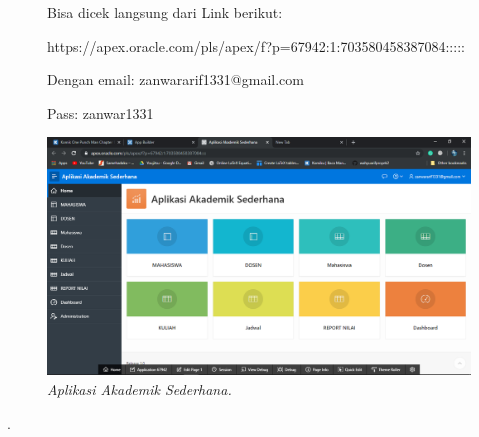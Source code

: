 \begin{enumerate}
\begin{figure}[!htbp]
    \par
    Bisa dicek langsung dari Link berikut:
    \par
    https://apex.oracle.com/pls/apex/f?p=67942:1:703580458387084:::::
    \par
    Dengan email: zanwararif1331@gmail.com
    \par Pass: zanwar1331
    \begin{center}
    \includegraphics[scale=0.3]{figures/Screenshot(135).png}
    \caption{\textit{Aplikasi Akademik Sederhana.}}
    \end{center}   
    \end{figure}
\end{enumerate}

.
